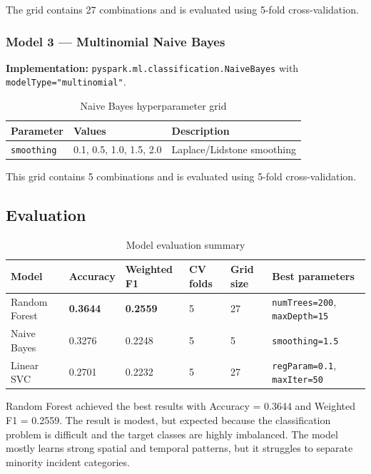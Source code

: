 \documentclass[12pt,a4paper]{article}
\begin{document}
The grid contains 27 combinations and is evaluated using 5-fold cross-validation.

\subsubsection{Model 3 --- Multinomial Naive Bayes}

\textbf{Implementation:} \texttt{pyspark.ml.classification.NaiveBayes} with \texttt{modelType="multinomial"}.

\begin{table}[H]
\centering
\caption{Naive Bayes hyperparameter grid}
\begin{tabular}{L{4cm} L{5cm} L{6cm}}
\toprule
\textbf{Parameter} & \textbf{Values} & \textbf{Description} \\
\midrule
\texttt{smoothing} & 0.1, 0.5, 1.0, 1.5, 2.0 & Laplace/Lidstone smoothing \\
\bottomrule
\end{tabular}
\end{table}

This grid contains 5 combinations and is evaluated using 5-fold cross-validation.

\subsection{Evaluation}

\begin{table}[H]
\centering
\caption{Model evaluation summary}
\begin{tabular}{L{3.2cm} L{2cm} L{2cm} L{2cm} L{2cm} L{4cm}}
\toprule
\textbf{Model} & \textbf{Accuracy} & \textbf{Weighted F1} & \textbf{CV folds} & \textbf{Grid size} & \textbf{Best parameters} \\
\midrule
Random Forest & \textbf{0.3644} & \textbf{0.2559} & 5 & 27 & \texttt{numTrees=200}, \texttt{maxDepth=15} \\
Naive Bayes & 0.3276 & 0.2248 & 5 & 5 & \texttt{smoothing=1.5} \\
Linear SVC & 0.2701 & 0.2232 & 5 & 27 & \texttt{regParam=0.1}, \texttt{maxIter=50} \\
\bottomrule
\end{tabular}
\end{table}

Random Forest achieved the best results with Accuracy = 0.3644 and Weighted F1 = 0.2559. The result is modest, but expected because the classification problem is difficult and the target classes are highly imbalanced. The model mostly learns strong spatial and temporal patterns, but it struggles to separate minority incident categories.
\end{document}
